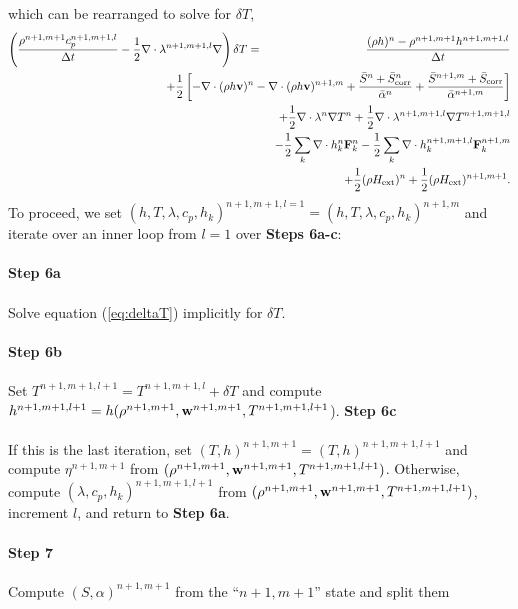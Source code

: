 \documentclass[final]{siamltex}
\def\Fb {{\bf F}}
\def\vb {{\bf v}}
\def\wb {{\bf w}}
\def\Hext {H_{\rm ext}}
\def\half   {\frac{1}{2}}
\begin{document}
which can be rearranged to solve for $\delta T$,
\begin{eqnarray}
\left(\frac{\rho^{n+1,m+1}c_p^{n+1,m+1,l}}{\Delta t} - \half\nabla\cdot\lambda^{n+1,m+1,l}\nabla\right)\delta T &=& \frac{(\rho h)^n - \rho^{n+1,m+1}h^{n+1,m+1,l}}{\Delta t}\nonumber\\
&&\hspace{-1.25in} + \half\left[-\nabla\cdot(\rho h\vb)^n - \nabla\cdot(\rho h\vb)^{n+1,m} + \frac{\bar{S}^n + \bar{S}_{\rm corr}^n}{\bar{\alpha}^n} + \frac{\bar{S}^{n+1,m} + \bar{S}_{\rm corr}}{\bar{\alpha}^{n+1,m}}\right]\nonumber\\
&&\hspace{-1.25in} + \half\nabla\cdot\lambda^n\nabla T^n + \half\nabla\cdot\lambda^{n+1,m+1,l}\nabla T^{n+1,m+1,l}\nonumber\\
&&\hspace{-1.25in} - \half\sum_k\nabla\cdot h_k^n \Fb_k^n - \half\sum_k\nabla\cdot h_k^{n+1,m+1,l} \Fb_k^{n+1,m}\nonumber\\
&&\hspace{-1.25in} + \half(\rho\Hext)^n + \half(\rho\Hext)^{n+1,m+1}.\label{eq:deltaT}
\end{eqnarray}
To proceed, we set $(h,T,\lambda,c_p,h_k)^{n+1,m+1,l=1} = (h,T,\lambda,c_p,h_k)^{n+1,m}$
and iterate over an inner loop from $l=1$ over {\bf Steps 6a-c}:\\ \\
{\bf Step 6a}\\ \\
Solve equation (\ref{eq:deltaT}) implicitly for $\delta T$.\\ \\
{\bf Step 6b}\\ \\
Set $T^{n+1,m+1,l+1} = T^{n+1,m+1,l} + \delta T$ and compute 
$h^{n+1,m+1,l+1} = h(\rho^{n+1,m+1},\wb^{n+1,m+1},T^{n+1,m+1,l+1}$).
{\bf Step 6c}\\ \\
If this is the last iteration, set $(T,h)^{n+1,m+1} = (T,h)^{n+1,m+1,l+1}$
and compute $\eta^{n+1,m+1}$ from $(\rho^{n+1,m+1},\wb^{n+1,m+1},T^{n+1,m+1,l+1})$.
Otherwise,
compute $(\lambda,c_p,h_k)^{n+1,m+1,l+1}$ from 
$(\rho^{n+1,m+1},\wb^{n+1,m+1},T^{n+1,m+1,l+1})$,
increment $l$, and return to {\bf Step 6a}.\\ \\
{\bf Step 7}\\ \\
Compute $(S,\alpha)^{n+1,m+1}$ from the ``$n+1,m+1$'' state and split them 
\end{document}
